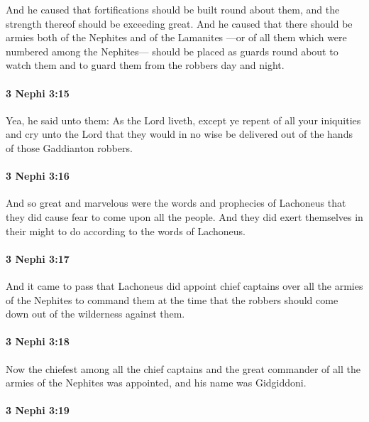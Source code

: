 			And he caused that fortifications should be built round about them,
			and the strength thereof should be exceeding great.
			And he caused that there should be armies
			both of the Nephites and of the Lamanites
			---or of all them which were numbered among the Nephites---
			should be placed as guards round about to watch them
			and to guard them from the robbers day and night.

		\paragraph{3 Nephi 3:15} %
			\label{3NEPHI-3-15}

			Yea, he said unto them:
			As the Lord liveth,
			except ye repent of all your iniquities and cry unto the Lord
			that they would in no wise be delivered
			out of the hands of those Gaddianton robbers.

		\paragraph{3 Nephi 3:16} %
			\label{3NEPHI-3-16}

			And so great and marvelous were the words and prophecies of Lachoneus
			that they did cause fear to come upon all the people.
			And they did exert themselves in their might
			to do according to the words of Lachoneus.

		\paragraph{3 Nephi 3:17} %
			\label{3NEPHI-3-17}

			And it came to pass that
			Lachoneus did appoint chief captains over all the armies of the Nephites
			to command them at the time
			that the robbers should come down out of the wilderness against them.

		\paragraph{3 Nephi 3:18} %
			\label{3NEPHI-3-18}

			Now the chiefest among all the chief captains
			and the great commander of all the armies of the Nephites was appointed,
			and his name was Gidgiddoni.

		\paragraph{3 Nephi 3:19} %
			\label{3NEPHI-3-19}

